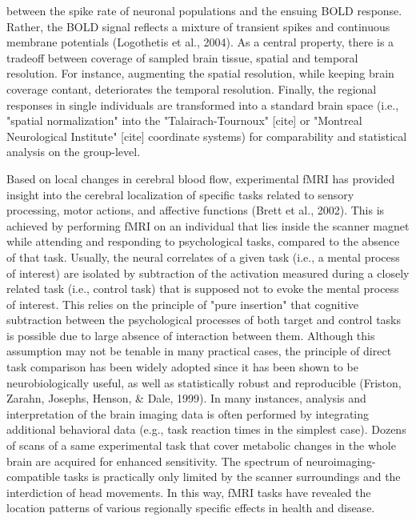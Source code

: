 \documentclass[authoryear,review,3p]{elsarticle}
\begin{document}
between the spike rate of neuronal populations and the ensuing
BOLD response. Rather, the BOLD signal reflects a mixture of
transient spikes and continuous membrane potentials (Logothetis et al., 2004).
%
As a central property, there is a tradeoff between
coverage of sampled brain tissue, spatial and temporal resolution. 
For instance, augmenting the spatial resolution, while keeping
brain coverage contant, deteriorates the temporal resolution.
%
Finally,
the regional responses in single individuals are transformed
into a standard brain space
(i.e., "spatial normalization" into the
"Talairach-Tournoux" [cite] or
"Montreal Neurological Institute" [cite]
coordinate systems)
for comparability and statistical analysis on the group-level.


Based on local changes in cerebral blood flow,
experimental fMRI has provided
insight into the cerebral localization
of specific tasks related to sensory processing, motor actions,
and affective functions
(Brett et al., 2002).
This is achieved by
performing fMRI on an individual that lies
inside the scanner magnet
while attending and responding to psychological tasks,
compared to the absence of that task.
Usually, the neural correlates of a given task
(i.e., a mental process of interest) are isolated by subtraction
of the activation measured during a closely related task (i.e., control task)
that is supposed not to evoke the mental process of interest.
This relies on the principle of "pure insertion" that
cognitive subtraction between the psychological processes of both
target and control tasks is possible due to large absence of
interaction between them.
Although this assumption may not be tenable in many
practical cases,
the principle of direct task comparison has been widely adopted
since it has been shown to be
neurobiologically useful, as well as statistically robust and reproducible
(Friston, Zarahn, Josephs, Henson, & Dale, 1999).
%
In many instances,
analysis and interpretation of the brain imaging data
is often performed by integrating additional
behavioral data (e.g., task reaction times in the simplest case).
Dozens of scans of a same experimental task
that cover metabolic changes in the whole brain are acquired
for enhanced sensitivity.
%
The spectrum of neuroimaging-compatible tasks is practically
only limited by the scanner surroundings
and the interdiction of head movements.
%
In this way, fMRI tasks have revealed the location patterns of
various regionally specific effects in health and disease.
\end{document}

